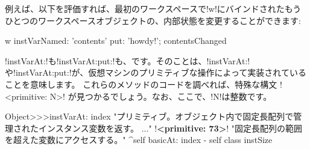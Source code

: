 \documentclass[a4paper,10pt,twoside]{book}
\begin{document}
例えば、以下を評価すれば、最初のワークスペースで\ct!w!にバインドされたもうひとつのワークスペースオブジェクトの、内部状態を変更することができます:
\begin{code}{}
w instVarNamed: 'contents' put: 'howdy!'; contentsChanged
\end{code}


\ct!instVarAt:!も\ct!instVarAt:put:!も、です。そのことは、\ct!instVarAt:!や\ct!instVarAt:put:!が、\pharo{}仮想マシンのプリミティブな操作によって実装されていることを意味します。
これらのメソッドのコードを調べれば、特殊な構文 \ct!<primitive: N>! が見つかるでしょう。なお、ここで、\ct!N!は整数です。

\begin{code}{}
Object>>>instVarAt: index 
	"プリミティブ。オブジェクト内で固定長配列で管理されたインスタンス変数を返す。 ..."
	!\textbf{<primitive: 73>}!
	"固定長配列の範囲を超えた変数にアクセスする。"
	^self basicAt: index - self class instSize		
\end{code}
\end{document}
